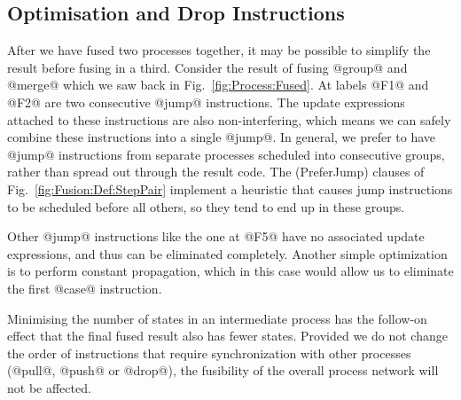 %
%


\subsection{Optimisation and Drop Instructions}
\label{s:Optimisation}
After we have fused two processes together, it may be possible to simplify the result before fusing in a third. Consider the result of fusing @group@ and @merge@ which we saw back in Fig.~\ref{fig:Process:Fused}. At labels @F1@ and @F2@ are two consecutive @jump@ instructions. The update expressions attached to these instructions are also non-interfering, which means we can safely combine these instructions into a single @jump@. In general, we prefer to have @jump@ instructions from separate processes scheduled into consecutive groups, rather than spread out through the result code. The (PreferJump) clauses of Fig.~\ref{fig:Fusion:Def:StepPair} implement a heuristic that causes jump instructions to be scheduled before all others, so they tend to end up in these groups.

Other @jump@ instructions like the one at @F5@ have no associated update expressions, and thus can be eliminated completely. Another simple optimization is to perform constant propagation, which in this case would allow us to eliminate the first @case@ instruction. 

Minimising the number of states in an intermediate process has the follow-on effect that the final fused result also has fewer states. Provided we do not change the order of instructions that require synchronization with other processes (@pull@, @push@ or @drop@), the fusibility of the overall process network will not be affected.

